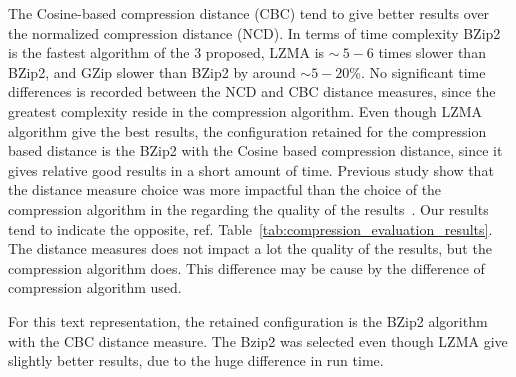 The Cosine-based compression distance (CBC) tend to give better results over the normalized compression distance (NCD).
In terms of time complexity BZip2 is the fastest algorithm of the 3 proposed, LZMA is $\sim ~5-6$ times slower than BZip2, and GZip slower than BZip2 by around $\sim 5-20$\%.
No significant time differences is recorded between the NCD and CBC distance measures, since the greatest complexity reside in the compression algorithm.
Even though LZMA algorithm give the best results, the configuration retained for the compression based distance is the BZip2 with the Cosine based compression distance, since it gives relative good results in a short amount of time.
Previous study show that the distance measure choice was more impactful than the choice of the compression algorithm in the regarding the quality of the results~\cite{comparing_compression}.
Our results tend to indicate the opposite, ref. Table~\ref{tab:compression_evaluation_results}.
The distance measures does not impact a lot the quality of the results, but the compression algorithm does.
This difference may be cause by the difference of compression algorithm used.

For this text representation, the retained configuration is the BZip2 algorithm with the CBC distance measure.
The Bzip2 was selected even though LZMA give slightly better results, due to the huge difference in run time.

